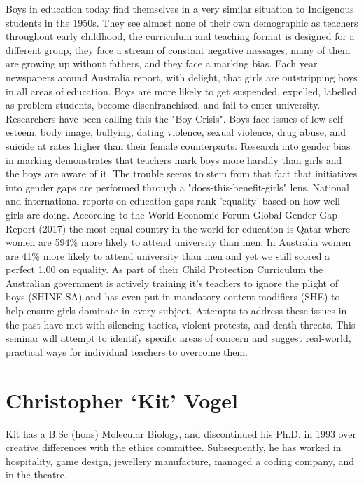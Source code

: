 \documentclass[twoside,14pt,a4paper,notitlepage]{memoir}
\begin{document}
Boys in education today find themselves in a very similar situation to Indigenous students in the 1950s. They see almost none of their own demographic as teachers throughout early childhood, the curriculum and teaching format is designed for a different group, they face a stream of constant negative messages, many of them are growing up without fathers, and they face a marking bias.
Each year newspapers around Australia report, with delight, that girls are outstripping boys in all areas of education. Boys are more likely to get suspended, expelled, labelled as problem students, become disenfranchised, and fail to enter university. Researchers have been calling this the "Boy Crisis".
Boys face issues of low self esteem, body image, bullying, dating violence, sexual violence, drug abuse, and suicide at rates higher than their female counterparts. Research into gender bias in marking demonstrates that teachers mark boys more harshly than girls and the boys are aware of it.
The trouble seems to stem from that fact that initiatives into gender gaps are performed through a "does-this-benefit-girls" lens. National and international reports on education gaps rank 'equality' based on how well girls are doing. According to the World Economic Forum Global Gender Gap Report (2017) the most equal country in the world for education is Qatar where women are 594\% more likely to attend university than men. In Australia women are 41\% more likely to attend university than men and yet we still scored a perfect 1.00 on equality.
As part of their Child Protection Curriculum the Australian government is actively training it's teachers to ignore the plight of boys (SHINE SA) and has even put in mandatory content modifiers (SHE) to help ensure girls dominate in every subject.
Attempts to address these issues in the past have met with silencing tactics, violent protests, and death threats.
This seminar will attempt to identify specific areas of concern and suggest real-world, practical ways for individual teachers to overcome them.

\section*{Christopher `Kit' Vogel}

Kit has a B.Sc (hons) Molecular Biology, and discontinued his Ph.D. in 1993 over creative differences with the ethics committee. Subsequently, he has worked in hospitality, game design, jewellery manufacture, managed a coding company, and in the theatre.
\end{document}

